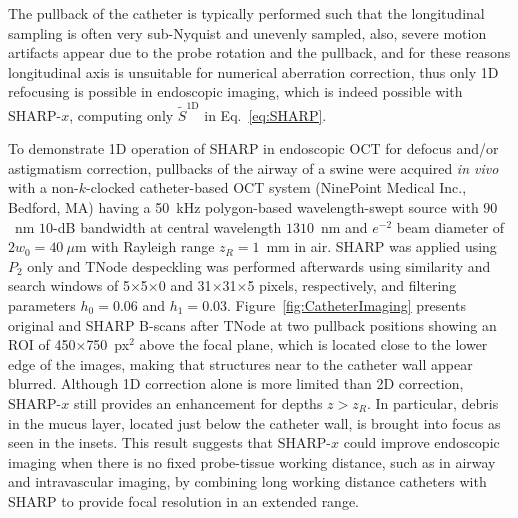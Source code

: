 The pullback of the catheter is typically performed such that the longitudinal sampling is often very sub-Nyquist and unevenly sampled, also, severe motion artifacts appear due to the probe rotation and the pullback, and for these reasons longitudinal axis is unsuitable for numerical aberration correction, thus only 1D refocusing is possible in endoscopic imaging, which is indeed possible with SHARP-$x$, computing only $\tilde{S}^{\text{1D}}$ in Eq.~\eqref{eq:SHARP}.

To demonstrate 1D operation of SHARP in endoscopic OCT for defocus and/or astigmatism correction, pullbacks of the airway of a swine were acquired \textit{in vivo} with a non-$k$-clocked catheter-based OCT system (NinePoint Medical Inc., Bedford, MA) having a 50~kHz polygon-based wavelength-swept source with $90$~nm $10$-dB bandwidth at central wavelength $1310$~nm and $e^{-2}$ beam diameter of $2w_0=40~\mu$m with Rayleigh range $z_R=1$~mm in air. SHARP was applied using $P_2$ only and TNode despeckling was performed afterwards using similarity and search windows of 5$\times$5$\times$0 and 31$\times$31$\times$5 pixels, respectively, and filtering parameters $h_0 = 0.06$ and $h_1 = 0.03$. Figure~\ref{fig:CatheterImaging} presents original and SHARP B-scans after TNode at two pullback positions showing an ROI of 450$\times$750~px$^2$ above the focal plane, which is located close to the lower edge of the images, making that structures near to the catheter wall appear blurred. Although 1D correction alone is more limited than 2D correction, SHARP-$x$ still provides an enhancement for depths $z>z_R$. In particular, debris in the mucus layer, located just below the catheter wall, is brought into focus as seen in the insets. This result suggests that SHARP-$x$ could improve endoscopic imaging when there is no fixed probe-tissue working distance, such as in airway and intravascular imaging, by combining long working distance catheters with SHARP to provide focal resolution in an extended range.

